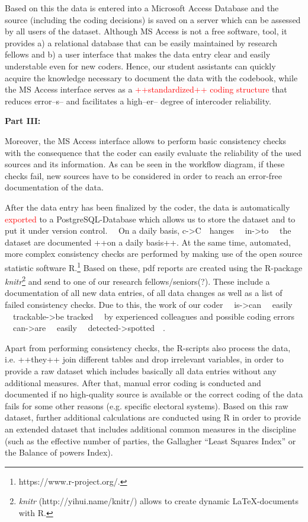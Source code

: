 \documentclass[
  11pt
]{article}
\begin{document}
Based on this the data is entered into a Microsoft Access Database and the source (including the coding decisions) is saved on a server which can be assessed by all users of the dataset. Although MS Access is not a free software, tool, it provides a) a relational database that can be easily maintained by research fellows and b) a user interface that makes the data entry clear and easily understable even for new coders. Hence, our student assistants can quickly acquire the knowledge necessary to document the data with the codebook, while the MS Access interface serves as a \textcolor{red}{{++standardized++} coding structure} that reduces error{--s--} and facilitates a high{--er--} degree of intercoder reliability.

\textbf{Part III:}

Moreover, the MS Access interface allows to perform basic consistency checks with the consequence that the coder can easily evaluate the reliability of the used sources and its information. As can be seen in the workflow diagram, if these checks fail, new sources have to be considered in order to reach an error-free documentation of the data.

After the data entry has been finalized by the coder, the data is automatically \textcolor{red}{exported} to a PostgreSQL-Database which allows us to store the dataset and to put it under version control. {~~On a daily basis, c->C~~}hanges {~~in->to~~} the dataset are documented {++on a daily basis++}. At the same time, automated, more complex consistency checks are performed by making use of the open source statistic software R.\footnote{https://www.r-project.org/.} Based on these, pdf reports are created using the R-package \textit{knitr}\footnote{\textit{knitr} (http://yihui.name/knitr/) allows to create dynamic \LaTeX-documents with R.} and send to one of our research fellows/seniors(?). These include a documentation of all new data entries, of all data changes as well as a list of failed consistency checks. Due to this, the work of our coder {~~is->can~~} easily {~~trackable->be tracked~~} by experienced colleagues and possible coding errors {~~can->are~~} easily {~~detected->spotted~~}.

Apart from performing consistency checks, the R-scripts also process the data, i.e. {++they++} join different tables and drop irrelevant variables, in order to provide a raw dataset which includes basically all data entries without any additional measures. After that, manual error coding is conducted and documented if no high-quality source is available or the correct coding of the data fails for some other reasons (e.g. specific electoral systems). Based on this raw dataset, further additional calculations are conducted using R in order to provide an extended dataset that includes additional common measures in the discipline (such as the effective number of parties, the Gallagher “Least Squares Index” or the Balance of powers Index).
\end{document}

